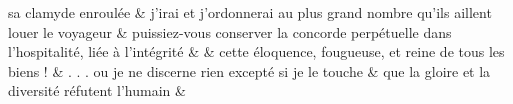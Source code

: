 \documentclass[12pt,onecolumn,twoside,a4paper]{memoir}
\begin{document}
\begin{pairs}
\begin{Rightside}
                              sa clamyde enroulée \&
                         \stanza 
                     j’irai et j’ordonnerai au plus grand nombre qu’ils aillent louer le
                              voyageur  \&
                         \stanza puissiez-vous conserver la concorde perpétuelle dans l’hospitalité,
                              liée à l’intégrité  & 
                      \&
                         \stanza 
                     cette éloquence, fougueuse, et reine de tous les biens !  \&
                         \stanza 
                     . . . ou je ne discerne rien excepté si je le touche  \&
                         \stanza 
                     que la gloire et la diversité réfutent l’humain \&

                     
                  \endnumbering
		\end{Rightside}
               \end{pairs}
	\Columns
            
            
\end{document}
